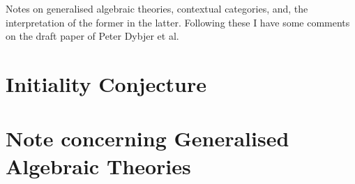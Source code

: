 \documentclass[10pt,a4paper]{article}
\theoremstyle{remark}
\begin{document}
\newcommand{\gatinterpretationintro}[5]{
\refstepcounter{equation}(\theequation)\label{#1}& \gatrule{#2}{#3}&$\mapsto$&&\cellcolor{lightergrey}$#4$&#5}

\newcommand{\gatinterpretationmapeqv}[2]{&&&=&\ \ $#1$&#2}
\newcommand{\gatinterpretationmapeqvsingle}[1]{&&&=&\multicolumn{2}{l}{\ \ $#1$}}

\newcommand{\gatinterpretationaxcond}[5]{
\refstepcounter{equation}(\theequation)\label{#1}& \gatrule{#2}{#3}&$\scriptstyle iff$&&\cellcolor{lightergrey}$#4$&#5}

\newcommand{\gatinterpretationaxcondrhscontinuation}[2]{ &&&& \cellcolor{lightergrey}\hspace{0.5cm} $#1$ &{#2}}

\newcommand{\gatinterpretationaxeqv}[2]{&&$\scriptstyle iff$&&$#1$&#2}

\newcommand{\duple}[1]{\llangle #1 \rrangle}

\newcommand{\bigtuple}[1]{\big \langle #1 \big \rangle}

\newcommand{\ncrightcrosssection}[3][-30] 
{\ncarc[arcangle=#1,nodesepA=5pt,nodesepB=-2pt,offsetA=0pt,offsetB=1pt,arrowsize=5pt,arrowinset=0.7]{->}{#2}{#3}}
\newcommand{\ncrightsimplesection}[3][-30] 
{\ncarc[arcangle=#1,nodesepA=6pt,nodesepB=5pt,offsetA=-1pt,offsetB=0pt,arrowsize=5pt,arrowinset=0.7]{->}{#2}{#3}}
\newcommand{\ncleftcrosssection}[3][30] 
{\ncarc[arcangle=#1,nodesepA=5pt,nodesepB=-2pt,offsetA=0pt,offsetB=-1pt,arrowsize=5pt,arrowinset=0.7]{->}{#2}{#3}}
\newcommand{\ncleftsimplesection}[3][30] 
{\ncarc[arcangle=#1,nodesepA=6pt,nodesepB=5pt,offsetA=1pt,offsetB=0pt,arrowsize=5pt,arrowinset=0.7]{->}{#2}{#3}}


Notes on  generalised algebraic theories, contextual categories, and, the interpretation of the former in the latter. Following these I have some comments on the draft paper of Peter Dybjer et al. 



\section{Initiality Conjecture}


\section{Note concerning Generalised Algebraic Theories}

\end{document}
